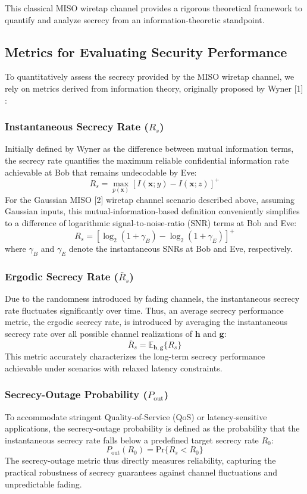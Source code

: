 \documentclass[10pt,a4paper]{article} %
\begin{document}
This classical MISO wiretap channel provides a rigorous theoretical framework to quantify and analyze secrecy from an information-theoretic standpoint.

\subsection{Metrics for Evaluating Security Performance}
To quantitatively assess the secrecy provided by the MISO wiretap channel, we rely on metrics derived from information theory, originally proposed by Wyner [1] :

\subsubsection{Instantaneous Secrecy Rate ($R_s$)}
Initially defined by Wyner as the difference between mutual information terms, the secrecy rate quantifies the maximum reliable confidential information rate achievable at Bob that remains undecodable by Eve:
\[
R_s = \max_{p(\mathbf{x})} \left[ I(\mathbf{x}; y) - I(\mathbf{x}; z) \right]^+
\]
For the Gaussian MISO [2] wiretap channel scenario described above, assuming Gaussian inputs, this mutual-information-based definition conveniently simplifies to a difference of logarithmic signal-to-noise-ratio (SNR) terms at Bob and Eve:
\[
R_s = \left[ \log_2(1 + \gamma_B) - \log_2(1 + \gamma_E) \right]^+
\]
where $\gamma_B$ and $\gamma_E$ denote the instantaneous SNRs at Bob and Eve, respectively.

\subsubsection{Ergodic Secrecy Rate ($\bar{R}_s$)}
Due to the randomness introduced by fading channels, the instantaneous secrecy rate fluctuates significantly over time. Thus, an average secrecy performance metric, the ergodic secrecy rate, is introduced by averaging the instantaneous secrecy rate over all possible channel realizations of $\mathbf{h}$ and $\mathbf{g}$:
\[
\bar{R}_s = \mathbb{E}_{\mathbf{h}, \mathbf{g}}\{R_s\}
\]
This metric accurately characterizes the long-term secrecy performance achievable under scenarios with relaxed latency constraints.

\subsubsection{Secrecy-Outage Probability ($P_{\text{out}}$)}
To accommodate stringent Quality-of-Service (QoS) or latency-sensitive applications, the secrecy-outage probability is defined as the probability that the instantaneous secrecy rate falls below a predefined target secrecy rate $R_0$:
\[
P_{\text{out}}(R_0) = \text{Pr}\{R_s < R_0\}
\]
The secrecy-outage metric thus directly measures reliability, capturing the practical robustness of secrecy guarantees against channel fluctuations and unpredictable fading.
\end{document}
